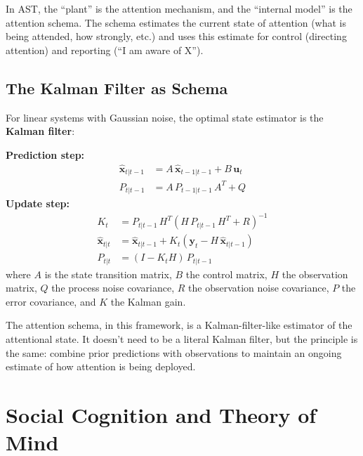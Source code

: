 \documentclass[11pt,a4paper]{report}
\begin{document}
In AST, the ``plant'' is the attention mechanism, and the ``internal model'' is the attention schema. The schema estimates the current state of attention (what is being attended, how strongly, etc.) and uses this estimate for control (directing attention) and reporting (``I am aware of X'').

\subsection{The Kalman Filter as Schema}

For linear systems with Gaussian noise, the optimal state estimator is the \textbf{Kalman filter}:

\begin{mathbox}
\vspace{-6pt}
\textbf{Prediction step:}
\begin{align}
  \hat{\mathbf{x}}_{t|t-1} &= A\, \hat{\mathbf{x}}_{t-1|t-1} + B\, \mathbf{u}_t \label{eq:kf_pred}\\
  P_{t|t-1} &= A\, P_{t-1|t-1}\, A^T + Q \label{eq:kf_cov_pred}
\end{align}
\textbf{Update step:}
\begin{align}
  K_t &= P_{t|t-1}\, H^T \left(H\, P_{t|t-1}\, H^T + R\right)^{-1} \label{eq:kf_gain}\\
  \hat{\mathbf{x}}_{t|t} &= \hat{\mathbf{x}}_{t|t-1} + K_t\left(\mathbf{y}_t - H\, \hat{\mathbf{x}}_{t|t-1}\right) \label{eq:kf_update}\\
  P_{t|t} &= (I - K_t H)\, P_{t|t-1} \label{eq:kf_cov_update}
\end{align}
where $A$ is the state transition matrix, $B$ the control matrix, $H$ the observation matrix, $Q$ the process noise covariance, $R$ the observation noise covariance, $P$ the error covariance, and $K$ the Kalman gain.
\vspace{-4pt}
\end{mathbox}

The attention schema, in this framework, is a Kalman-filter-like estimator of the attentional state. It doesn't need to be a literal Kalman filter, but the principle is the same: combine prior predictions with observations to maintain an ongoing estimate of how attention is being deployed.

\section{Social Cognition and Theory of Mind}
\end{document}
